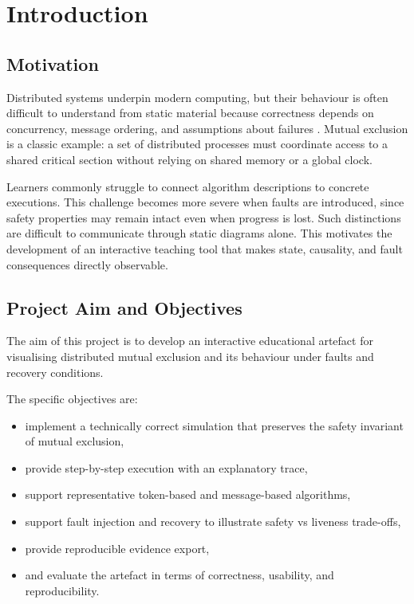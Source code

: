 \chapter{Introduction}
\label{ch:introduction}

\section{Motivation}
Distributed systems underpin modern computing, but their behaviour is often difficult to understand from static material because correctness depends on concurrency, message ordering, and assumptions about failures \cite{tanenbaum2017distributed,coulouris2011distributed,lynch1996distributed}. Mutual exclusion is a classic example: a set of distributed processes must coordinate access to a shared critical section without relying on shared memory or a global clock.

Learners commonly struggle to connect algorithm descriptions to concrete executions. This challenge becomes more severe when faults are introduced, since safety properties may remain intact even when progress is lost. Such distinctions are difficult to communicate through static diagrams alone. This motivates the development of an interactive teaching tool that makes state, causality, and fault consequences directly observable.

\section{Project Aim and Objectives}
The aim of this project is to develop an interactive educational artefact for visualising distributed mutual exclusion and its behaviour under faults and recovery conditions.

The specific objectives are:
\begin{itemize}
  \item implement a technically correct simulation that preserves the safety invariant of mutual exclusion,
  \item provide step-by-step execution with an explanatory trace,
  \item support representative token-based and message-based algorithms,
  \item support fault injection and recovery to illustrate safety vs liveness trade-offs,
  \item provide reproducible evidence export,
  \item and evaluate the artefact in terms of correctness, usability, and reproducibility.
\end{itemize}

